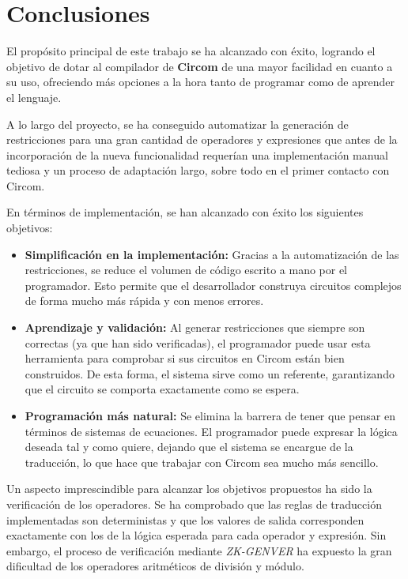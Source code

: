 \documentclass[a4paper,12pt]{report}
\begin{document}
	\section{Conclusiones}
	
	\noindent El propósito principal de este trabajo se ha alcanzado con éxito, logrando el objetivo de dotar al compilador de \textbf{Circom} de una mayor facilidad en cuanto a su uso, ofreciendo más opciones a la hora tanto de programar como de aprender el lenguaje.
	
	\vspace{0.2cm}
	\noindent A lo largo del proyecto, se ha conseguido automatizar la generación de restricciones para una gran cantidad de operadores y expresiones que antes de la incorporación de la nueva funcionalidad requerían una implementación manual tediosa y un proceso de adaptación largo, sobre todo en el primer contacto con Circom.
	
	\vspace{0.2cm}
	\noindent En términos de implementación, se han alcanzado con éxito los siguientes objetivos:
	
	\begin{itemize}
		\item \textbf{Simplificación en la implementación:} Gracias a la automatización de las restricciones, se reduce el volumen de código escrito a mano por el programador. Esto permite que el desarrollador construya circuitos complejos de forma mucho más rápida y con menos errores.
		\item \textbf{Aprendizaje y validación:} Al generar restricciones que siempre son correctas (ya que han sido verificadas), el programador puede usar esta herramienta para comprobar si sus circuitos en Circom están bien construidos. De esta forma, el sistema sirve como un referente, garantizando que el circuito se comporta exactamente como se espera.
		\item \textbf{Programación más natural:} Se elimina la barrera de tener que pensar en términos de sistemas de ecuaciones. El programador puede expresar la lógica  deseada tal y como quiere, dejando que el sistema se encargue de la traducción, lo que hace que trabajar con Circom sea mucho más sencillo.
	\end{itemize}
	
	\vspace{0.2cm}
	
	\noindent Un aspecto imprescindible para alcanzar los objetivos propuestos ha sido la verificación de los operadores. Se ha comprobado que las reglas de traducción implementadas son deterministas y que los valores de salida corresponden exactamente con los de la lógica esperada para cada operador y expresión. Sin embargo, el proceso de verificación mediante \textit{ZK-GENVER} ha expuesto la gran dificultad de los operadores aritméticos de división y módulo. 
	
\end{document}
